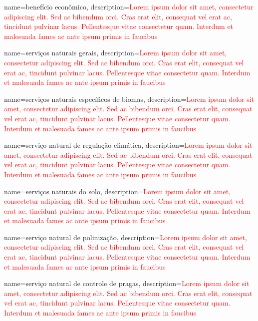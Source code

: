 {
	name=benefício econômico,
	description={\textcolor{red}{Lorem ipsum dolor sit amet, consectetur adipiscing elit. Sed ac bibendum orci. Cras erat elit, consequat vel erat ac, tincidunt pulvinar lacus. Pellentesque vitae consectetur quam. Interdum et malesuada fames ac ante ipsum primis in faucibus}}
}

{
	name=serviços naturais gerais,
	description={\textcolor{red}{Lorem ipsum dolor sit amet, consectetur adipiscing elit. Sed ac bibendum orci. Cras erat elit, consequat vel erat ac, tincidunt pulvinar lacus. Pellentesque vitae consectetur quam. Interdum et malesuada fames ac ante ipsum primis in faucibus}}
}

{
	name=serviços naturais específicos de biomas,
	description={\textcolor{red}{Lorem ipsum dolor sit amet, consectetur adipiscing elit. Sed ac bibendum orci. Cras erat elit, consequat vel erat ac, tincidunt pulvinar lacus. Pellentesque vitae consectetur quam. Interdum et malesuada fames ac ante ipsum primis in faucibus}}
}

{
	name=serviço natural de regulação climática,
	description={\textcolor{red}{Lorem ipsum dolor sit amet, consectetur adipiscing elit. Sed ac bibendum orci. Cras erat elit, consequat vel erat ac, tincidunt pulvinar lacus. Pellentesque vitae consectetur quam. Interdum et malesuada fames ac ante ipsum primis in faucibus}}
}

{
	name=serviços naturais do solo,
	description={\textcolor{red}{Lorem ipsum dolor sit amet, consectetur adipiscing elit. Sed ac bibendum orci. Cras erat elit, consequat vel erat ac, tincidunt pulvinar lacus. Pellentesque vitae consectetur quam. Interdum et malesuada fames ac ante ipsum primis in faucibus}}
}

{
	name=serviço natural de polinização,
	description={\textcolor{red}{Lorem ipsum dolor sit amet, consectetur adipiscing elit. Sed ac bibendum orci. Cras erat elit, consequat vel erat ac, tincidunt pulvinar lacus. Pellentesque vitae consectetur quam. Interdum et malesuada fames ac ante ipsum primis in faucibus}}
}

{
	name=serviço natural de controle de pragas,
	description={\textcolor{red}{Lorem ipsum dolor sit amet, consectetur adipiscing elit. Sed ac bibendum orci. Cras erat elit, consequat vel erat ac, tincidunt pulvinar lacus. Pellentesque vitae consectetur quam. Interdum et malesuada fames ac ante ipsum primis in faucibus}}
}

